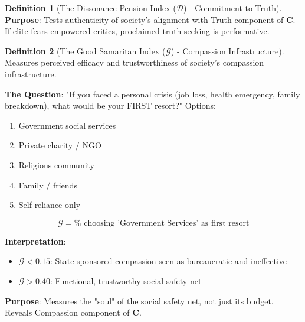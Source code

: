 \documentclass[11pt,a4paper]{article}
\theoremstyle{definition}
\newtheorem{definition}{Definition}[section]
\theoremstyle{remark}
\begin{document}
\begin{small}
\begin{definition}[The Dissonance Pension Index (\(\mathcal{D}\)) - Commitment to Truth]
\textbf{Purpose}: Tests authenticity of society's alignment with Truth component of \(\mathbf{C}\). If elite fears empowered critics, proclaimed truth-seeking is performative.
\end{definition}

\begin{definition}[The Good Samaritan Index (\(\mathcal{G}\)) - Compassion Infrastructure]
Measures perceived efficacy and trustworthiness of society's compassion infrastructure.

\textbf{The Question}: "If you faced a personal crisis (job loss, health emergency, family breakdown), what would be your FIRST resort?" Options:
\begin{enumerate}
    \item Government social services
    \item Private charity / NGO
    \item Religious community
    \item Family / friends
    \item Self-reliance only
\end{enumerate}

\begin{equation}
\mathcal{G} = \% \text{ choosing 'Government Services' as first resort}
\end{equation}

\textbf{Interpretation}:
\begin{itemize}
    \item \(\mathcal{G} < 0.15\): State-sponsored compassion seen as bureaucratic and ineffective
    \item \(\mathcal{G} > 0.40\): Functional, trustworthy social safety net
\end{itemize}

\textbf{Purpose}: Measures the "soul" of the social safety net, not just its budget. Reveals Compassion component of \(\mathbf{C}\).
\end{definition}


\end{small}
\end{document}
